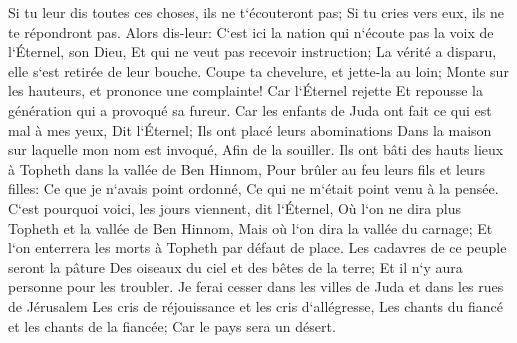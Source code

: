 \verse Si tu leur dis toutes ces choses, ils ne t`écouteront pas; Si tu cries vers eux, ils ne te répondront pas. 
\verse Alors dis-leur: C`est ici la nation qui n`écoute pas la voix de l`Éternel, son Dieu, Et qui ne veut pas recevoir instruction; La vérité a disparu, elle s`est retirée de leur bouche. 
\verse Coupe ta chevelure, et jette-la au loin; Monte sur les hauteurs, et prononce une complainte! Car l`Éternel rejette Et repousse la génération qui a provoqué sa fureur. 
\verse Car les enfants de Juda ont fait ce qui est mal à mes yeux, Dit l`Éternel; Ils ont placé leurs abominations Dans la maison sur laquelle mon nom est invoqué, Afin de la souiller. 
\verse Ils ont bâti des hauts lieux à Topheth dans la vallée de Ben Hinnom, Pour brûler au feu leurs fils et leurs filles: Ce que je n`avais point ordonné, Ce qui ne m`était point venu à la pensée. 
\verse C`est pourquoi voici, les jours viennent, dit l`Éternel, Où l`on ne dira plus Topheth et la vallée de Ben Hinnom, Mais où l`on dira la vallée du carnage; Et l`on enterrera les morts à Topheth par défaut de place. 
\verse Les cadavres de ce peuple seront la pâture Des oiseaux du ciel et des bêtes de la terre; Et il n`y aura personne pour les troubler. 
\verse Je ferai cesser dans les villes de Juda et dans les rues de Jérusalem Les cris de réjouissance et les cris d`allégresse, Les chants du fiancé et les chants de la fiancée; Car le pays sera un désert. 

